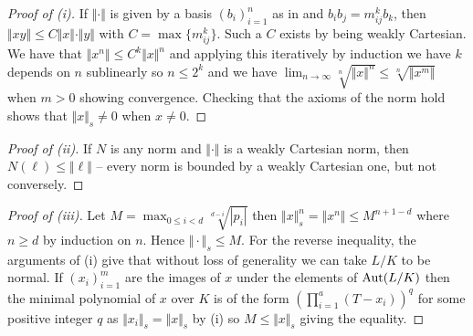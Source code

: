 \begin{proof}[Proof of (i)]
    If $\Vert\cdot\Vert$ is given by a basis $(b_{i})_{i=1}^{n}$ as in  and $b_{i}b_{j}=m_{ij}^{k}b_{k}$, then $\Vert xy\Vert\leq C\Vert x\Vert\cdot\Vert y\Vert$ with $C=\max\{m_{ij}^{k}\}$. Such a $C$ exists by being weakly Cartesian. We have that $\Vert x^{n}\Vert\leq C^{k}\Vert x\Vert^{n}$ and applying this iteratively by induction we have $k$ depends on $n$ sublinearly so $n\leq 2^{k}$ and we have $\lim_{n\to\infty}\sqrt[n]{\Vert x\Vert^{n}}\leq\sqrt[n]{\Vert x^{m}\Vert}$ when $m>0$ showing convergence. Checking that the axioms of the norm hold shows that $\Vert x\Vert_{s}\neq0$ when $x\neq0$. 
\end{proof}
\begin{proof}[Proof of (ii)]
    If $N$ is any norm and $\Vert\cdot\Vert$ is a weakly Cartesian norm, then $N(\ell)\leq\Vert \ell\Vert$ -- every norm is bounded by a weakly Cartesian one, but not conversely. 
\end{proof}
\begin{proof}[Proof of (iii)]
    Let $M=\max_{0\leq i<d}\sqrt[d-i]{|p_{i}|}$ then $\Vert x\Vert_{s}^{n}=\Vert x^{n}\Vert\leq M^{n+1-d}$ where $n\geq d$ by induction on $n$. Hence $\Vert\cdot\Vert_{s}\leq M$. For the reverse inequality, the arguments of (i) give that without loss of generality we can take $L/K$ to be normal. If $(x_{i})_{i=1}^{m}$ are the images of $x$ under the elements of $\mathrm{Aut}(L/K)$ then the minimal polynomial of $x$ over $K$ is of the form $\left(\prod_{i=1}^{a}(T-x_{i})\right)^{q}$ for some positive integer $q$ as $\Vert x_{i}\Vert_{s}=\Vert x\Vert_{s}$ by (i) so $M\leq\Vert x\Vert_{s}$ giving the equality. 
\end{proof}